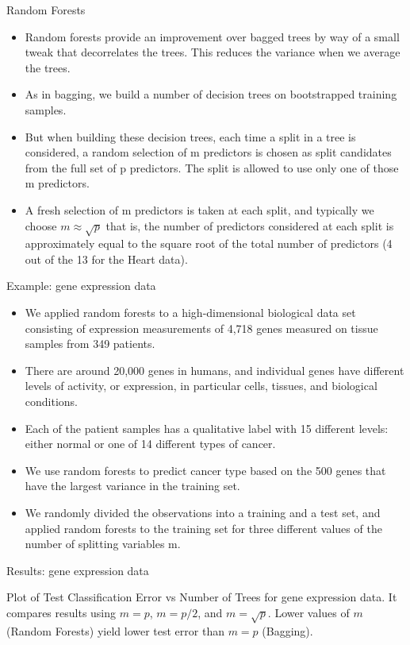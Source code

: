 \documentclass[aspectratio=169, 11pt]{beamer}
\begin{document}
\begin{frame}{Random Forests}
\begin{itemize}
    \item Random forests provide an improvement over bagged trees by way of a small tweak that decorrelates the trees. This reduces the variance when we average the trees.
    \item As in bagging, we build a number of decision trees on bootstrapped training samples.
    \item But when building these decision trees, each time a split in a tree is considered, a random selection of m predictors is chosen as split candidates from the full set of p predictors. The split is allowed to use only one of those m predictors.
    \item A fresh selection of m predictors is taken at each split, and typically we choose $m \approx \sqrt{p}$ that is, the number of predictors considered at each split is approximately equal to the square root of the total number of predictors (4 out of the 13 for the Heart data).
\end{itemize}
\end{frame}

\begin{frame}{Example: gene expression data}
\begin{itemize}
    \item We applied random forests to a high-dimensional biological data set consisting of expression measurements of 4,718 genes measured on tissue samples from 349 patients.
    \item There are around 20,000 genes in humans, and individual genes have different levels of activity, or expression, in particular cells, tissues, and biological conditions.
    \item Each of the patient samples has a qualitative label with 15 different levels: either normal or one of 14 different types of cancer.
    \item We use random forests to predict cancer type based on the 500 genes that have the largest variance in the training set.
    \item We randomly divided the observations into a training and a test set, and applied random forests to the training set for three different values of the number of splitting variables m.
\end{itemize}
\end{frame}

\begin{frame}{Results: gene expression data}
\begin{tcolorbox}[colback=LightGray,title=Figure]
Plot of Test Classification Error vs Number of Trees for gene expression data. It compares results using $m=p$, $m=p/2$, and $m=\sqrt{p}$. Lower values of $m$ (Random Forests) yield lower test error than $m=p$ (Bagging).
\end{tcolorbox}
\end{frame}
\end{document}
